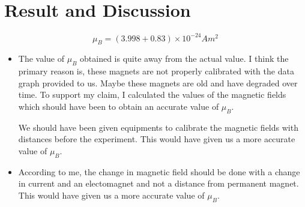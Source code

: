 \section{Result and Discussion}

    $$\mu_B = (3.998 + 0.83) \times 10^{-24} Am^2$$

    \begin{itemize}
        \item The value of $\mu_B$ obtained is quite away from the actual value. I think the primary reason is, these magnets are not properly calibrated with the data graph provided to us. Maybe these magnets are old and have degraded over time. To support my claim, I calculated the values of  the magnetic fields which should have been to obtain an accurate value of $\mu_B$.
        \begin{table}[H]
            \centering
        \end{table}

        We should have been given equipments to calibrate the magnetic fields with distances before the experiment. This would have given us a more accurate value of $\mu_B$.

        \item According to me, the change in magnetic field should be done with a change in current and an electomagnet and not a distance from permanent magnet. This would have given us a more accurate value of $\mu_B$.
    \end{itemize}